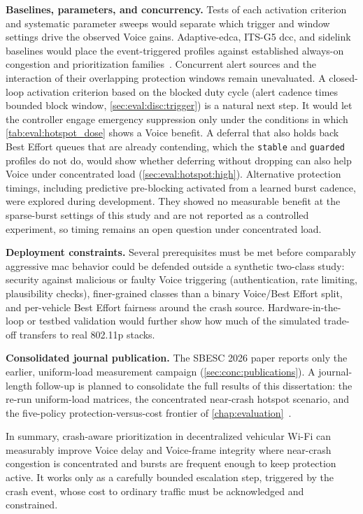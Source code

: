 \medskip
\noindent\textbf{Baselines, parameters, and concurrency.}
Tests of each activation criterion and systematic parameter sweeps would separate which trigger and window settings drive the observed Voice gains.
Adaptive-\gls{edca}, ITS-G5 \gls{dcc}, and sidelink baselines would place the event-triggered profiles against established always-on congestion and prioritization families~\cite{etsi_dcc_2018,romdhani2003AdaptiveEDCF}.
Concurrent alert sources and the interaction of their overlapping protection windows remain unevaluated.
A closed-loop activation criterion based on the blocked duty cycle (alert cadence times bounded block window, \autoref{sec:eval:disc:trigger}) is a natural next step.
It would let the controller engage emergency suppression only under the conditions in which \autoref{tab:eval:hotspot_dose} shows a Voice benefit.
A deferral that also holds back Best Effort queues that are already contending, which the \texttt{stable} and \texttt{guarded} profiles do not do, would show whether deferring without dropping can also help Voice under concentrated load (\autoref{sec:eval:hotspot:high}).
Alternative protection timings, including predictive pre-blocking activated from a learned burst cadence, were explored during development.
They showed no measurable benefit at the sparse-burst settings of this study and are not reported as a controlled experiment, so timing remains an open question under concentrated load.

\medskip
\noindent\textbf{Deployment constraints.}
Several prerequisites must be met before comparably aggressive \gls{mac} behavior could be defended outside a synthetic two-class study: security against malicious or faulty Voice triggering (authentication, rate limiting, plausibility checks), finer-grained classes than a binary Voice/Best Effort split, and per-vehicle Best Effort fairness around the crash source.
Hardware-in-the-loop or testbed validation would further show how much of the simulated trade-off transfers to real 802.11p stacks.

\medskip
\noindent\textbf{Consolidated journal publication.}
The SBESC 2026 paper reports only the earlier, uniform-load measurement campaign (\autoref{sec:conc:publications}).
A journal-length follow-up is planned to consolidate the full results of this dissertation: the re-run uniform-load matrices, the concentrated near-crash hotspot scenario, and the five-policy protection-versus-cost frontier of \autoref{chap:evaluation}~\cite{aguiar2026crash}.

In summary, crash-aware prioritization in decentralized vehicular Wi-Fi can measurably improve Voice delay and Voice-frame integrity where near-crash congestion is concentrated and bursts are frequent enough to keep protection active.
It works only as a carefully bounded escalation step, triggered by the crash event, whose cost to ordinary traffic must be acknowledged and constrained.
